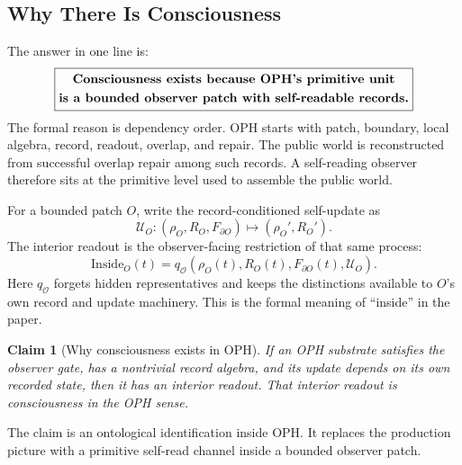 \documentclass[11pt]{article}
\newtheorem{claim}[theorem]{Claim}
\theoremstyle{remark}
\theoremstyle{plain}
\begin{document}
\subsection{Why There Is Consciousness}

The answer in one line is:
\[
\boxed{
\begin{gathered}
\text{\bfseries Consciousness exists because OPH's primitive unit}\\
\text{\bfseries is a bounded observer patch with self-readable records.}
\end{gathered}
}
\]
The formal reason is dependency order. OPH starts with patch, boundary, local algebra, record, readout, overlap, and repair. The public world is reconstructed from successful overlap repair among such records. A self-reading observer therefore sits at the primitive level used to assemble the public world.

For a bounded patch \(O\), write the record-conditioned self-update as
\[
\mathcal U_O:
(\rho_O,R_O,F_{\partial O})
\longmapsto
(\rho_O',R_O').
\]
The interior readout is the observer-facing restriction of that same process:
\[
\boxed{
\mathrm{Inside}_O(t)
=
q_{\mathcal O}
\!\left(
\rho_O(t),R_O(t),F_{\partial O}(t),\mathcal U_O
\right).
}
\]
Here \(q_{\mathcal O}\) forgets hidden representatives and keeps the distinctions available to \(O\)'s own record and update machinery. This is the formal meaning of ``inside'' in the paper.

\begin{claim}[Why consciousness exists in OPH]
If an OPH substrate satisfies the observer gate, has a nontrivial record algebra, and its update depends on its own recorded state, then it has an interior readout. That interior readout is consciousness in the OPH sense.
\end{claim}

The claim is an ontological identification inside OPH. It replaces the production picture with a primitive self-read channel inside a bounded observer patch.
\end{document}
